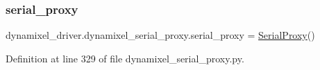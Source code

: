 \subsubsection{\texorpdfstring{serial\+\_\+proxy}{serial\_proxy}}
{\footnotesize\ttfamily dynamixel\+\_\+driver.\+dynamixel\+\_\+serial\+\_\+proxy.\+serial\+\_\+proxy = \hyperlink{classdynamixel__driver_1_1dynamixel__serial__proxy_1_1_serial_proxy}{Serial\+Proxy}()}



Definition at line 329 of file dynamixel\+\_\+serial\+\_\+proxy.\+py.

